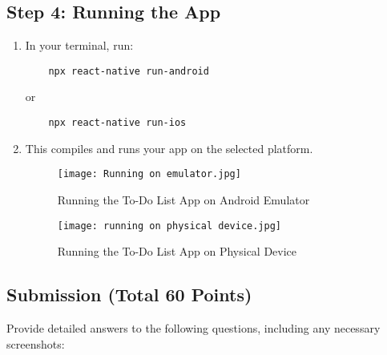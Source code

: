 \documentclass{article}
\begin{document}
\subsection{Step 4: Running the App}
\begin{enumerate}
    \item In your terminal, run:
    \begin{verbatim}
    npx react-native run-android
    \end{verbatim}
    or
    \begin{verbatim}
    npx react-native run-ios
    \end{verbatim}
    \item This compiles and runs your app on the selected platform.
    \begin{figure}[H]
        \centering
        \texttt{[image: Running on emulator.jpg]}
        \caption{Running the To-Do List App on Android Emulator}
    \end{figure}
    \begin{figure}[H]
        \centering
        \texttt{[image: running on physical device.jpg]}
        \caption{Running the To-Do List App on Physical Device}
    \end{figure}
\end{enumerate}

\subsection{Submission (Total 60 Points)}
Provide detailed answers to the following questions, including any necessary screenshots:
\end{document}
